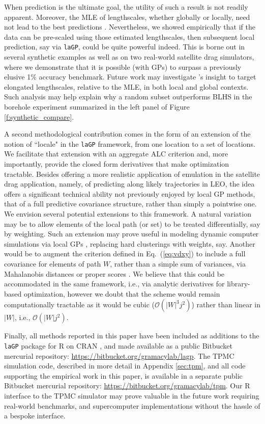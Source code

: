 \documentclass[12pt]{article}
\begin{document}
When prediction is the ultimate goal, the utility of such a result is not
readily apparent.  Moreover, the MLE of lengthscales, whether globally or locally,
need not lead to the best predictions \citep{zhang:2004}.  Nevertheless, we
showed empirically that if the data can be pre-scaled using those estimated
lengthscales, then subsequent local prediction, say via {\tt laGP}, could be
quite powerful indeed. This is borne out in several synthetic examples as well
as on two real-world satellite drag simulators, where we demonstrate that it is
possible (with GPs) to surpass a previously elusive 1\% accuracy benchmark.
Future work may investigate \citeauthor{zhang:2004}'s insight to target
elongated lengthscales, relative to the MLE, in both local and global
contexts.  Such analysis may help explain why a random subset outperforms BLHS
in the borehole experiment summarized in the left panel of Figure
\ref{f:synthetic_compare}.

A second methodological contribution comes in the form of an extension of the
notion of ``locale" in the {\tt laGP} framework, from one location to a set of
locations.  We facilitate that extension with an aggregate ALC criterion and,
more importantly, provide the closed form derivatives that make optimization
tractable. Besides offering a more realistic application of emulation in the
satellite drag application, namely, of predicting along likely trajectories in
LEO, the idea offers a significant technical ability not
previously enjoyed by local GP methods, that of a full predictive covariance
structure, rather than simply a pointwise one.  We envision several potential
extensions to this framework.  A natural variation may be to allow elements of
the local path (or set) to be treated differentially, say by weighting. Such
an extension may prove useful in modeling dynamic computer simulations via
local GPs \citep{Zhang:etal:2016}, replacing hard clusterings with weights,
say.  Another would be to augment the criterion defined in Eq.~(\ref{eq:vdxy}) to include
a full covariance for elements of path $W$, rather than a simple sum of
variances, via Mahalanobis distances or proper scores
\citep[Eq.~(25)][]{gneiting:raftery:2007}.  We believe that this could be
accommodated in the same framework, i.e., via analytic derivatives for
library-based optimization, however we doubt that the scheme would remain
computationally tractable as it would be cubic ($\mathcal{O}(|W|^3j^2)$) rather than linear in $|W|$, i.e., $\mathcal{O}(|W|j^2)$.

Finally, all methods reported in this paper have
been included as additions to the {\tt laGP} package for {\sf R} on CRAN
\citep{laGP,gramacy:jss:2016}, and made available as a public Bitbucket
mercurial repository:
\url{https://bitbucket.org/gramacylab/lagp}.  The TPMC simulation code,
described in more detail in Appendix \ref{sec:tpm}, and all code supporting
the empirical work in this paper, is available in a separate public
Bitbucket mercurial repository: \url{https://bitbucket.org/gramacylab/tpm}.
Our {\sf R} interface to the TPMC simulator may prove valuable in the future work
requiring real-world benchmarks, and supercomputer implementations without the
hassle of a bespoke interface.
\end{document}
